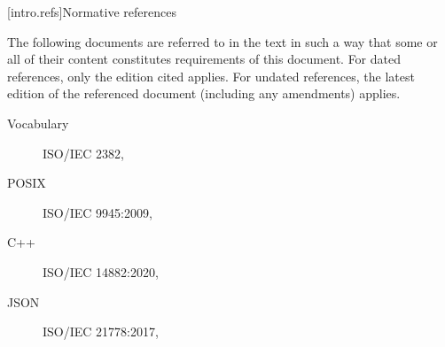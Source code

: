 
[intro.refs]{Normative references}%
%

\pnum
{}%
The following documents are referred to in the text in such a way that some or
all of their content constitutes requirements of this document. For dated
references, only the edition cited applies. For undated references, the latest
edition of the referenced document (including any amendments) applies.

\begin{description}


\item[Vocabulary] ISO/IEC 2382, 
\item[POSIX] ISO/IEC 9945:2009, 
\item[C++] ISO/IEC 14882:2020, 
\item[JSON] ISO/IEC 21778:2017, 


\end{description}
